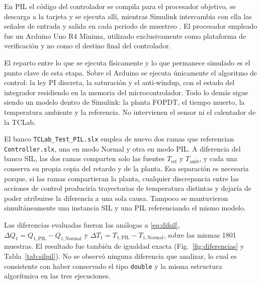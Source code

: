 \documentclass[conference,a4paper,10pt]{IEEEtran}
\newcommand{\Tref}{T_{\mathrm{ref}}}
\newcommand{\Tamb}{T_{\mathrm{amb}}}
\begin{document}
En PIL el código del controlador se compila para el procesador objetivo, se descarga a la tarjeta y
se ejecuta allí, mientras Simulink intercambia con ella las señales de entrada y salida en cada
periodo de muestreo \cite{mw_pil}. El procesador empleado fue un Arduino Uno R4 Minima, utilizado
exclusivamente como plataforma de verificación y no como el destino final del controlador.

El reparto entre lo que se ejecuta físicamente y lo que permanece simulado es el punto clave de esta
etapa. Sobre el Arduino se ejecuta únicamente el algoritmo de control: la ley PI discreta, la
saturación y el anti-windup, con el estado del integrador residiendo en la memoria del
microcontrolador. Todo lo demás sigue siendo un modelo dentro de Simulink: la planta FOPDT, el
tiempo muerto, la temperatura ambiente y la referencia. No intervienen el sensor ni el calentador de
la TCLab.

El banco \texttt{TCLab\_Test\_PIL.slx} emplea de nuevo dos ramas que referencian
\texttt{Controller.slx}, una en modo Normal y otra en modo PIL. A diferencia del banco SIL, las dos
ramas comparten solo las fuentes $\Tref$ y $\Tamb$, y cada una conserva su propia copia del retardo
y de la planta. Esa separación es necesaria porque, si las ramas compartieran la planta, cualquier
discrepancia entre las acciones de control produciría trayectorias de temperatura distintas y
dejaría de poder atribuirse la diferencia a una sola causa. Tampoco se mantuvieron simultáneamente
una instancia SIL y una PIL referenciando el mismo modelo.

Las diferencias evaluadas fueron las análogas a \eqref{eq:difsil},
$\Delta Q_1 = Q_{1,\mathrm{PIL}} - Q_{1,\mathrm{Normal}}$ y
$\Delta T_1 = T_{1,\mathrm{PIL}} - T_{1,\mathrm{Normal}}$, sobre las mismas \num{1801} muestras. El
resultado fue también de igualdad exacta (Fig.~\ref{fig:diferencias} y Tabla~\ref{tab:silpil}). No
se observó ninguna diferencia que analizar, lo cual es consistente con haber conservado el tipo
\texttt{double} y la misma estructura algorítmica en las tres ejecuciones.
\end{document}
